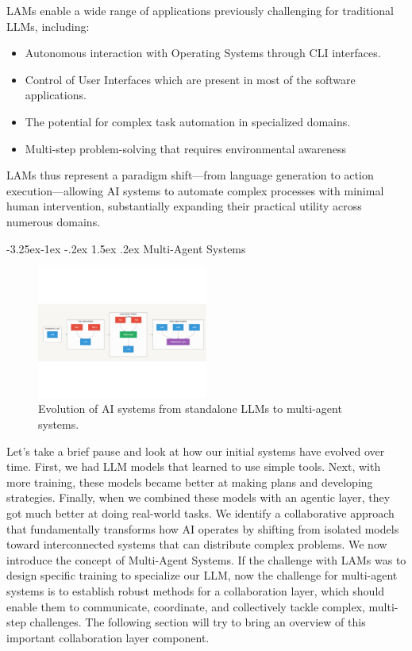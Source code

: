 \documentclass[journal,twoside,10pt]{IEEEtran}
\makeatletter
\renewcommand\subsection{\@startsection{subsection}{2}{\z@}%
                       {-3.25ex\@plus -1ex \@minus -.2ex}%
                       {1.5ex \@plus .2ex}%
                       {\normalfont\large\bfseries}}
\makeatother
\begin{document}
LAMs enable a wide range of applications previously challenging for traditional LLMs, including:

\begin{itemize}
    \item Autonomous interaction with Operating Systems through CLI interfaces.
    \item Control of User Interfaces which are present in most of the software applications.
    \item The potential for complex task automation in specialized domains.
    \item Multi-step problem-solving that requires environmental awareness
\end{itemize}

LAMs thus represent a paradigm shift—from language generation to action execution—allowing AI systems to automate complex processes with minimal human intervention, substantially expanding their practical utility across numerous domains.

\subsection{Multi-Agent Systems}

\begin{figure}[htbp]
    \centering
    \includegraphics[width=0.5\textwidth, trim=0 150pt 0 150pt, clip]{lams_diagram.pdf}
    \caption{Evolution of AI systems from standalone LLMs to multi-agent systems.}
    \label{fig:lam-evolution}
\end{figure}

Let's take a brief pause and look at how our initial systems have evolved over time. First, we had LLM models that learned to use simple tools. Next, with more training, these models became better at making plans and developing strategies. Finally, when we combined these models with an agentic layer, they got much better at doing real-world tasks. We identify a collaborative approach that fundamentally transforms how AI operates by shifting from isolated models toward interconnected systems that can distribute complex problems. We now introduce the concept of Multi-Agent Systems. If the challenge with LAMs was to design specific training to specialize our LLM, now the challenge for multi-agent systems is to establish robust methods for a collaboration layer, which should enable them to communicate, coordinate, and collectively tackle complex, multi-step challenges. The following section will try to bring an overview of this important collaboration layer component.
\end{document}

